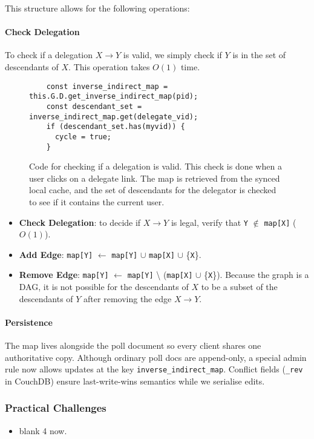 This structure allows for the following operations:
\paragraph{Check Delegation} To check if a delegation \(X\!\to\!Y\) is valid, we simply check if \(Y\) is in the set of descendants of \(X\). This operation takes \(O(1)\) time.
\begin{figure}[H]
  \centering
  \begin{verbatim}
    const inverse_indirect_map = this.G.D.get_inverse_indirect_map(pid);
    const descendant_set = inverse_indirect_map.get(delegate_vid);
    if (descendant_set.has(myvid)) {
      cycle = true;
    }
  \end{verbatim}
  \caption{Code for checking if a delegation is valid. This check is done when a user clicks on a delegate link. The map is retrieved from the synced local cache, and the set of descendants for the delegator is checked to see if it contains the current user.}
\end{figure}


\begin{itemize}
  \item \textbf{Check Delegation}: to decide if \(X\!\to\!Y\) is legal, verify that \verb|Y| $\notin$ \verb|map[X]| (\(O(1)\)).
  \item \textbf{Add Edge}: \verb|map[Y]| $\leftarrow$ \verb|map[Y]| $\cup$ \verb|map[X]| $\cup$ \{\verb|X|\}.
  \item \textbf{Remove Edge}: \verb|map[Y]| $\leftarrow$ \verb|map[Y]| \textbackslash{} (\verb|map[X]| $\cup$ \{\verb|X|\}). Because the graph is a DAG, it is not possible for the descendants of $X$ to be a subset of the descendants of $Y$ after removing the edge $X\to Y$.
\end{itemize}

\paragraph{Persistence} The map lives alongside the poll document so every client shares one authoritative copy. Although ordinary poll docs are append-only, a special admin rule now allows updates at the key \verb|inverse_indirect_map|. Conflict fields (\verb|_rev| in CouchDB) ensure last-write-wins semantics while we serialise edits.

\subsubsection{Practical Challenges}
\begin{itemize}
  \item blank 4 now.
\end{itemize}

